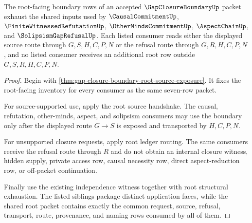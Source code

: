 \begin{theorem}\label{thm:gap-closure-boundary-root-consumer-coverage}
The root-facing boundary rows of an accepted $\GapClosureBoundaryUp$ packet exhaust the shared inputs used by $\CausalCommitmentUp$, $\FiniteWitnessedRefutationUp$, $\OtherMindsCommitmentUp$, $\AspectChainUp$, and $\SolipsismGapRefusalUp$. Each listed consumer reads either the displayed source route through $G,S,H,C,P,N$ or the refusal route through $G,R,H,C,P,N$, and no listed consumer receives an additional root row outside $G,S,R,H,C,P,N$.
\end{theorem}
\begin{proof}
Begin with \autoref{thm:gap-closure-boundary-root-source-exposure}. It fixes the root-facing inventory for every consumer as the same seven-row packet.

For source-supported use, apply the root source handshake. The causal, refutation, other-minds, aspect, and solipsism consumers may use the boundary only after the displayed route $G \longrightarrow S$ is exposed and transported by $H,C,P,N$.

For unsupported closure requests, apply root ledger routing. The same consumers receive the refusal route through $R$ and do not obtain an internal closure witness, hidden supply, private access row, causal necessity row, direct aspect-reduction row, or off-packet continuation.

Finally use the existing independence witness together with root structural exhaustion. The listed siblings package distinct application faces, while the shared root packet contains exactly the common request, source, refusal, transport, route, provenance, and naming rows consumed by all of them.
\end{proof}

